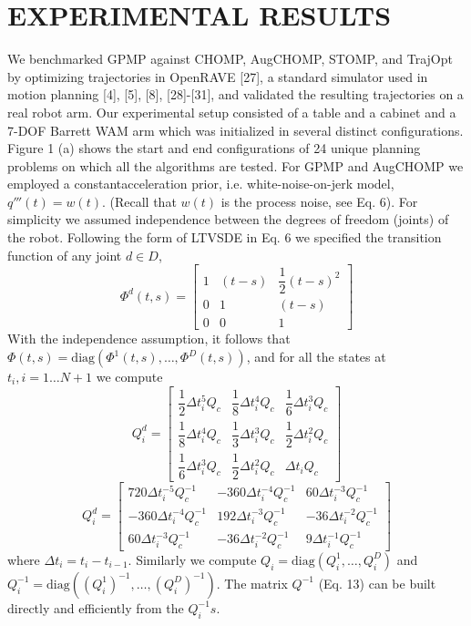 \documentclass{IEEEtran}
\begin{document}
\section{EXPERIMENTAL RESULTS}
We benchmarked GPMP against CHOMP, AugCHOMP,
STOMP, and TrajOpt by optimizing trajectories in OpenRAVE [27], a standard simulator used in motion planning [4],
[5], [8], [28]-[31], and validated the resulting trajectories
on a real robot arm. Our experimental setup consisted of a
table and a cabinet and a 7-DOF Barrett WAM arm which
was initialized in several distinct configurations. Figure 1 (a)
shows the start and end configurations of 24 unique planning
problems on which all the algorithms are tested.
For GPMP and AugCHOMP we employed a constantacceleration prior, i.e. white-noise-on-jerk model, $q'''(t)=w(t)$. (Recall that $w(t)$ is the process noise, see Eq. 6). For
simplicity we assumed independence between the degrees of
freedom (joints) of the robot. Following the form of LTVSDE in Eq. 6 we specified the transition function of any joint
$d \in D$,
\[
\Phi^d(t,s)=\begin{bmatrix}
1&(t-s)&\dfrac{1}{2}(t-s)^2\\
0&1&(t-s)\\
0&0&1
\tag{37}
\end{bmatrix}
\]
With the independence assumption, it follows that $\Phi(t, s) =
\text{diag}(\Phi^1
(t, s), \dots , \Phi^
D(t, s))$, and for all the states at $t_i
, i =
1 \dots N + 1$ we compute
\[
Q^d_i=\begin{bmatrix}
\dfrac{1}{2}\Delta t_i^5Q_c&\dfrac{1}{8}\Delta t_i^4Q_c&\dfrac{1}{6}\Delta t_i^3Q_c\\
\dfrac{1}{8}\Delta t_i^4Q_c&\dfrac{1}{3}\Delta t_i^3Q_c&\dfrac{1}{2}\Delta t_i^2Q_c\\
\dfrac{1}{6}\Delta t_i^3Q_c&\dfrac{1}{2}\Delta t_i^2Q_c&\Delta t_iQ_c
\end{bmatrix}
\]
\[
Q^d_i=\begin{bmatrix}
720\Delta t_i^{-5}Q_c^{-1}&-360\Delta t_i^{-4}Q_c^{-1}&60\Delta t_i^{-3}Q_c^{-1}\\
-360\Delta t_i^{-4}Q_c^{-1}&192\Delta t_i^{-3}Q_c^{-1}&-36\Delta t_i^{-2}Q_c^{-1}\\
60\Delta t_i^{-3}Q_c^{-1}&-36\Delta t_i^{-2}Q_c^{-1}&9\Delta t_i^{-1}Q_c^{-1}
\tag{38}
\end{bmatrix}
\]
where $\Delta t_i=t_i-t_{i-1}$. Similarly we compute $Q_i =\text{diag}(Q_i^1
, \dots, Q^D_i
)$ and $ Q_i^{-1}= \text{diag}((Q_i^{1})^{-1}
, \dots,(Q^D_i)^{-1})$.
The matrix $Q^{-1}$
(Eq. 13) can be built directly and efficiently
from the $Q_i^{-1}s$.
\end{document}

